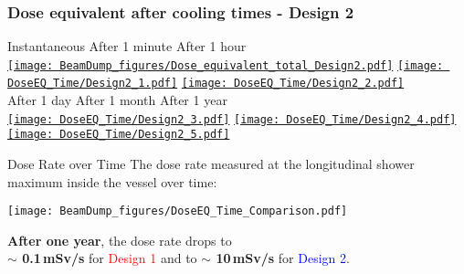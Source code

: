 \documentclass[xcolor={dvipsnames}]{beamer}
\begin{document}
\begin{frame}
  \frametitle{Dose equivalent after cooling times - \textbf{Design 2}}
  \hypertarget{coolingtimesprev_Design2}{}
  \begin{center}
    \hspace*{1cm} Instantaneous \hfill After 1 minute \hfill After 1 hour \hspace*{1.2cm} \\
  \hyperlink{Dose_equivalent_Design2}{\texttt{[image: BeamDump\_figures/Dose\_equivalent\_total\_Design2.pdf]}}
  \hyperlink{Dose_equivalent_minute_Design2}{\texttt{[image: DoseEQ\_Time/Design2\_1.pdf]}}
  \hyperlink{Dose_equivalent_hour_Design2}{\texttt{[image: DoseEQ\_Time/Design2\_2.pdf]}}\\
    \hspace*{1.2cm} After 1 day \hfill After 1 month \hfill After 1 year\hspace*{1.4cm} \\
  \hyperlink{Dose_equivalent_day_Design2}{\texttt{[image: DoseEQ\_Time/Design2\_3.pdf]}}
  \hyperlink{Dose_equivalent_month_Design2}{\texttt{[image: DoseEQ\_Time/Design2\_4.pdf]}}
  \hyperlink{Dose_equivalent_year_Design2}{\texttt{[image: DoseEQ\_Time/Design2\_5.pdf]}}
 \end{center}
\end{frame}
\begin{frame}{Dose Rate over Time}
The dose rate measured at the longitudinal shower maximum inside the vessel over time:
\begin{center}
  \texttt{[image: BeamDump\_figures/DoseEQ\_Time\_Comparison.pdf]}
\end{center}
\textbf{After one year}, the dose rate drops to \\\textbf{$\sim$ 0.1\,mSv/s} for \textcolor{Red}{Design 1} and to \textbf{$\sim$ 10\,mSv/s} for \textcolor{Blue}{Design 2}.
\end{frame}
\end{document}
